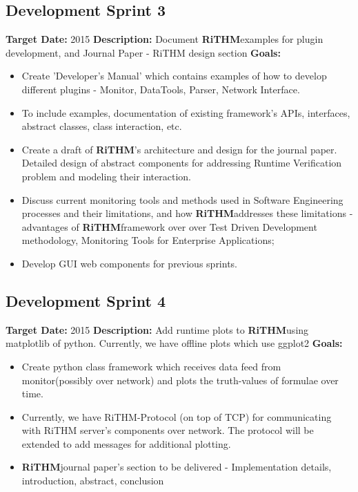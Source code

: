 \documentclass[]{article}
\newcommand{\rithm}{\textbf{RiTHM}\space}
\begin{document}
\subsection{Development Sprint 3}
\textbf{Target Date:}\space {} {2015}\newline
\textbf{Description:} Document \rithm examples for plugin development, and Journal Paper - RiTHM design section\newline
\textbf{Goals:}
\begin{itemize}
	\item
	Create 'Developer's Manual' which contains examples of how to develop different plugins - Monitor, DataTools, Parser, Network Interface.
	\item
	To include examples, documentation of existing framework's APIs, interfaces, abstract classes, class interaction, etc.
	\item
	Create a draft of \rithm's architecture and design for the journal paper. Detailed design of abstract components for addressing Runtime Verification problem and modeling their interaction.
	\item
	Discuss current monitoring tools and methods used in Software Engineering processes and their limitations, and how \rithm addresses these limitations - advantages of \rithm framework over over Test Driven Development methodology, Monitoring Tools for Enterprise Applications; 
	\item
	Develop GUI web components for previous sprints. 
\end{itemize}

\subsection{Development Sprint 4}
\textbf{Target Date:}\space {} {2015}\newline
\textbf{Description:} Add runtime plots to \rithm using matplotlib of python. Currently, we have offline plots which use ggplot2 \newline
\textbf{Goals:}
\begin{itemize}
	\item
	Create python class framework which receives data feed from monitor(possibly over network) and plots the truth-values of formulae over time.
	\item
	Currently, we have RiTHM-Protocol (on top of TCP) for communicating with RiTHM server's components over network. The protocol will be extended to add messages for additional plotting.
	\item
	\rithm journal paper's section to be delivered - Implementation details, introduction, abstract, conclusion
\end{itemize}
\end{document}
